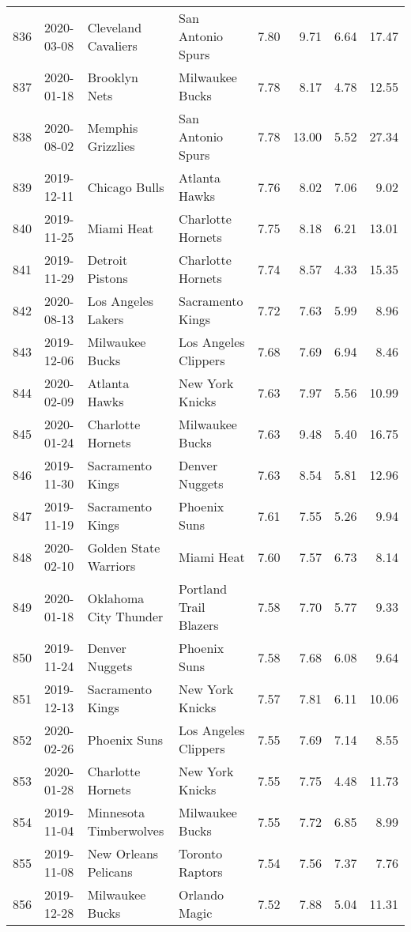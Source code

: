\documentclass[
  11pt,
]{article}
\theoremstyle{nonumberplain}
\begin{document}
\begin{longtable}{rl|llr|rrr}
836 & 2020-03-08 & Cleveland Cavaliers & San Antonio Spurs & 7.80 & 9.71 & 6.64 & 17.47\\
837 & 2020-01-18 & Brooklyn Nets & Milwaukee Bucks & 7.78 & 8.17 & 4.78 & 12.55\\
838 & 2020-08-02 & Memphis Grizzlies & San Antonio Spurs & 7.78 & 13.00 & 5.52 & 27.34\\
839 & 2019-12-11 & Chicago Bulls & Atlanta Hawks & 7.76 & 8.02 & 7.06 & 9.02\\
840 & 2019-11-25 & Miami Heat & Charlotte Hornets & 7.75 & 8.18 & 6.21 & 13.01\\
841 & 2019-11-29 & Detroit Pistons & Charlotte Hornets & 7.74 & 8.57 & 4.33 & 15.35\\
842 & 2020-08-13 & Los Angeles Lakers & Sacramento Kings & 7.72 & 7.63 & 5.99 & 8.96\\
843 & 2019-12-06 & Milwaukee Bucks & Los Angeles Clippers & 7.68 & 7.69 & 6.94 & 8.46\\
844 & 2020-02-09 & Atlanta Hawks & New York Knicks & 7.63 & 7.97 & 5.56 & 10.99\\
845 & 2020-01-24 & Charlotte Hornets & Milwaukee Bucks & 7.63 & 9.48 & 5.40 & 16.75\\
846 & 2019-11-30 & Sacramento Kings & Denver Nuggets & 7.63 & 8.54 & 5.81 & 12.96\\
847 & 2019-11-19 & Sacramento Kings & Phoenix Suns & 7.61 & 7.55 & 5.26 & 9.94\\
848 & 2020-02-10 & Golden State Warriors & Miami Heat & 7.60 & 7.57 & 6.73 & 8.14\\
849 & 2020-01-18 & Oklahoma City Thunder & Portland Trail Blazers & 7.58 & 7.70 & 5.77 & 9.33\\
850 & 2019-11-24 & Denver Nuggets & Phoenix Suns & 7.58 & 7.68 & 6.08 & 9.64\\
851 & 2019-12-13 & Sacramento Kings & New York Knicks & 7.57 & 7.81 & 6.11 & 10.06\\
852 & 2020-02-26 & Phoenix Suns & Los Angeles Clippers & 7.55 & 7.69 & 7.14 & 8.55\\
853 & 2020-01-28 & Charlotte Hornets & New York Knicks & 7.55 & 7.75 & 4.48 & 11.73\\
854 & 2019-11-04 & Minnesota Timberwolves & Milwaukee Bucks & 7.55 & 7.72 & 6.85 & 8.99\\
855 & 2019-11-08 & New Orleans Pelicans & Toronto Raptors & 7.54 & 7.56 & 7.37 & 7.76\\
856 & 2019-12-28 & Milwaukee Bucks & Orlando Magic & 7.52 & 7.88 & 5.04 & 11.31\\

\end{longtable}
\end{document}
